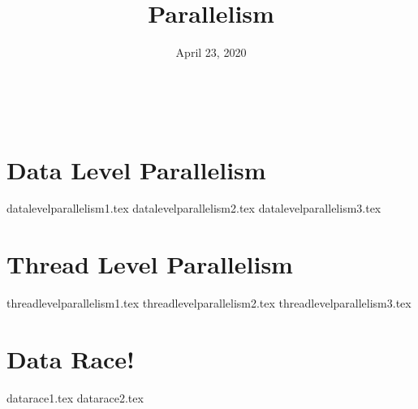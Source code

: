 \documentclass[11pt]{exam}
\title{Parallelism}
\date{April 23, 2020}
\begin{document}
\maketitle
​
\section{Data Level Parallelism}
\begin{questions}
{datalevelparallelism1.tex}
{datalevelparallelism2.tex}
{datalevelparallelism3.tex}
\end{questions}
\newpage

\section{Thread Level Parallelism}
\begin{questions}
{threadlevelparallelism1.tex}
{threadlevelparallelism2.tex}
{threadlevelparallelism3.tex}
\end{questions}
\newpage

\section{Data Race!}
\begin{questions}
{datarace1.tex}
{datarace2.tex}
\end{questions}
\newpage
\end{document}
